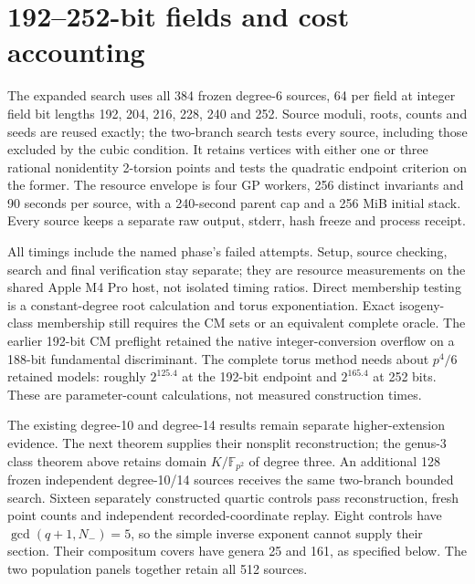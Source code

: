 \documentclass[11pt]{article}
\newcommand{\F}{\mathbb F}
\begin{document}
\section{192--252-bit fields and cost accounting}
The expanded search uses all 384 frozen degree-6 sources, 64 per field at
integer field bit lengths 192, 204, 216, 228, 240 and 252. Source moduli,
roots, counts and seeds are reused exactly; the two-branch search tests every
source, including those excluded by the cubic condition. It retains vertices
with either one or three rational nonidentity 2-torsion points and tests the
quadratic endpoint criterion on the former. The resource envelope is four GP
workers, 256 distinct invariants and 90 seconds per source, with a 240-second
parent cap and a 256 MiB initial stack. Every source keeps a separate raw
output, stderr, hash freeze and process receipt.

\begin{center}\end{center}
All timings include the named phase's failed attempts. Setup, source checking,
search and final verification stay separate; they are resource measurements
on the shared Apple M4 Pro host, not isolated timing ratios. Direct membership
testing is a constant-degree root calculation and torus exponentiation.
Exact isogeny-class membership still requires the CM sets or an equivalent
complete oracle. The earlier 192-bit CM preflight retained the native
integer-conversion overflow on a 188-bit fundamental discriminant.
The complete torus method needs about $p^4/6$ retained models: roughly
$2^{125.4}$ at the 192-bit endpoint and $2^{165.4}$ at 252 bits.
These are parameter-count calculations, not measured construction times.

The existing degree-10 and degree-14 results remain separate higher-extension
evidence. The next theorem supplies their nonsplit reconstruction; the
genus-3 class theorem above retains domain $K/\F_{p^2}$ of degree three.
An additional 128 frozen independent degree-10/14 sources receives the same
two-branch bounded search. Sixteen separately constructed quartic controls
pass reconstruction, fresh point counts and independent recorded-coordinate
replay. Eight controls have $\gcd(q+1,N_-)=5$, so the simple inverse exponent
cannot supply their section. Their compositum covers have genera 25 and 161,
as specified below. The two population panels together retain all 512 sources.
\end{document}
